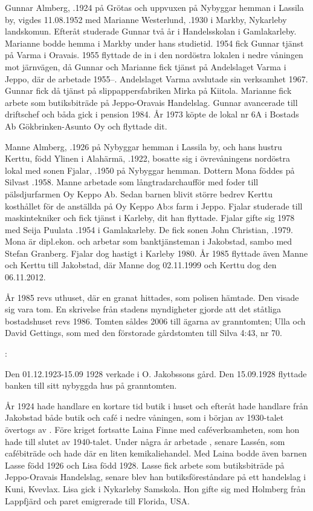 Gunnar Almberg, .1924 på Grötas och uppvuxen på Nybyggar hemman i Lassila by, vigdes 11.08.1952 med Marianne Westerlund, .1930 i Markby, Nykarleby landskomun. Efteråt studerade Gunnar två år i Handelsskolan i Gamlakarleby. Marianne bodde hemma i Markby under hans studietid. 1954 fick Gunnar tjänst på Varma i Oravais. 1955 flyttade de in i den nordöstra lokalen i nedre våningen mot järnvägen, då Gunnar och Marianne fick tjänst på Andelslaget Varma i Jeppo, där de arbetade 1955--. Andelslaget Varma avslutade sin verksamhet 1967. Gunnar fick då tjänst på slippappersfabriken Mirka på Kiitola. Marianne fick arbete som butiksbiträde på Jeppo-Oravais Handelslag. Gunnar avancerade till driftschef och båda gick i pension 1984. År 1973 köpte de lokal nr 6A i Bostads Ab Gökbrinken-Asunto Oy och flyttade dit.

Manne Almberg, .1926 på Nybyggar hemman i Lassila by, och hans hustru Kerttu, född Ylinen i Alahärmä, .1922, bosatte sig i övrevåningens nordöstra lokal med sonen Fjalar, .1950 på Nybyggar hemman. Dottern Mona föddes på Silvast .1958. Manne arbetade som långtradarchaufför med foder till pälsdjurfarmen Oy Keppo Ab. Sedan barnen blivit större bedrev Kerttu kosthållet för de anställda på Oy Keppo Ab:s farm i Jeppo.  Fjalar studerade till maskintekniker och fick tjänst i Karleby, dit han flyttade. Fjalar gifte sig 1978 med Seija Puulata .1954 i Gamlakarleby. De fick sonen John Christian, .1979. Mona är dipl.ekon. och arbetar som banktjänsteman i Jakobstad, sambo med Stefan Granberg. Fjalar dog hastigt i Karleby 1980. År 1985 flyttade även Manne och Kerttu till Jakobstad, där Manne dog 02.11.1999 och Kerttu dog den 06.11.2012.

År 1985 revs uthuset, där en granat hittades, som polisen hämtade. Den visade sig vara tom. En skrivelse från stadens myndigheter gjorde att det ståtliga bostadshuset revs 1986. Tomten såldes 2006 till ägarna av granntomten; Ulla och David Gettings, som med den förstorade gårdstomten till Silva 4:43, nr 70.



:

Den 01.12.1923-15.09 1928 verkade  i O. Jakobssons gård. Den 15.09.1928 flyttade banken till sitt nybyggda hus på granntomten.

År 1924 hade handlare  en kortare tid butik i huset och efteråt hade handlare  från Jakobstad både butik och café i nedre våningen, som i början av 1930-talet övertogs av . Före kriget fortsatte {Laina Finne} med caféverksamheten, som hon hade till slutet av 1940-talet. Under några år arbetade , senare Lassén, som cafébiträde och hade där en liten kemikaliehandel. Med Laina bodde även barnen Lasse född 1926 och Lisa född 1928. Lasse fick arbete som butiksbiträde på Jeppo-Oravais Handelslag, senare blev han butiksföreståndare på ett handelslag i Kuni, Kvevlax.  Lisa gick i Nykarleby Samskola. Hon gifte sig med Holmberg från Lappfjärd och paret emigrerade till Florida, USA.

